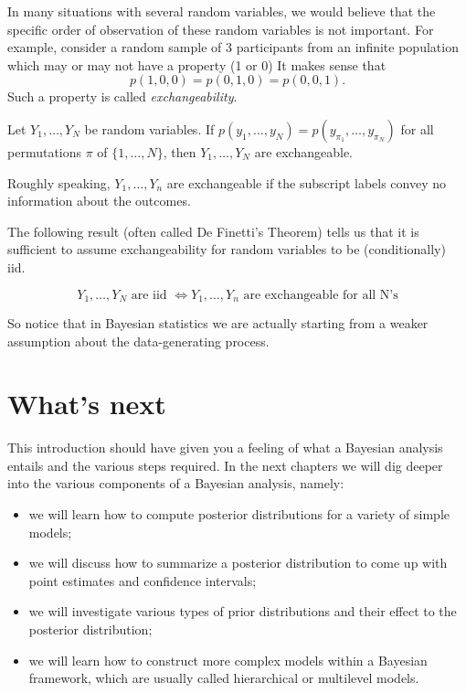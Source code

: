\documentclass[
]{book}
\begin{document}
In many situations with several random variables, we would believe that the specific order of observation of these random variables is not important. For example, consider a random sample of 3 participants from an infinite population which may or may not have a property (1 or 0) It makes sense that
\[
p(1,0,0) = p(0,1,0) = p(0,0,1).
\]
Such a property is called \emph{exchangeability}.

Let \(Y_1,\dots,Y_N\) be random variables. If \(p(y_1,\dots,y_N)=p(y_{\pi_1},\dots,y_{\pi_N})\) for all permutations \(\pi\) of \(\{1,\dots,N\}\), then \(Y_1,\dots,Y_N\) are exchangeable.

Roughly speaking, \(Y_1,\dots, Y_n\) are exchangeable if the subscript labels convey no information about the outcomes.

The following result (often called De Finetti's Theorem) tells us that it is sufficient to assume exchangeability for random variables to be (conditionally) iid.

\[
Y_1,\dots,Y_N \mbox{ are iid } \Longleftrightarrow Y_1,\dots,Y_n \mbox{ are exchangeable for all N's}
\]

So notice that in Bayesian statistics we are actually starting from a weaker assumption about the data-generating process.

\hypertarget{whats-next}{%
\section{What's next}\label{whats-next}}

This introduction should have given you a feeling of what a Bayesian analysis entails and the various steps required. In the next chapters we will dig deeper into the various components of a Bayesian analysis, namely:

\begin{itemize}
\item
  we will learn how to compute posterior distributions for a variety of simple models;
\item
  we will discuss how to summarize a posterior distribution to come up with point estimates and confidence intervals;
\item
  we will investigate various types of prior distributions and their effect to the posterior distribution;
\item
  we will learn how to construct more complex models within a Bayesian framework, which are usually called hierarchical or multilevel models.
\end{itemize}

  
\end{document}
